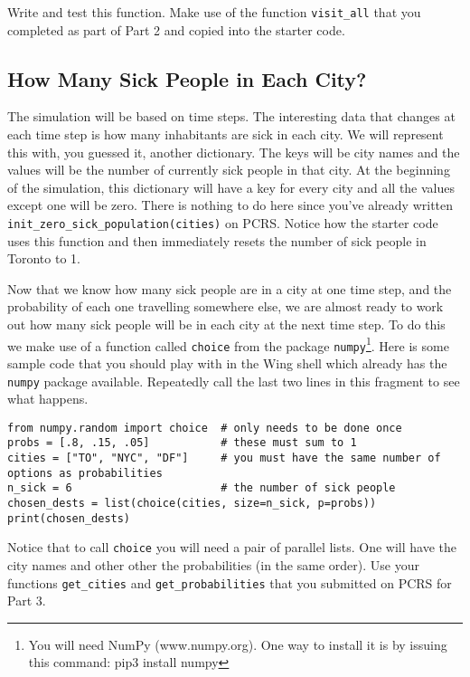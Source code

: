 \documentclass{assignment}
\begin{document}
Write and test this function. Make use of the function \verb|visit_all| that you completed as part of Part 2 and copied into the starter code.

\subsection*{How Many Sick People in Each City?}
 
The simulation will be based on time steps. The interesting data that changes at each time step is how many inhabitants are sick in each city. We will
represent this with, you guessed it, another dictionary. The keys will be city names and the values will be the number of currently sick people
in that city. At the beginning of the simulation, this dictionary will have a key for every city and all the values except one will be zero.
There is nothing to do here since you've already written \verb|init_zero_sick_population(cities)| on PCRS. Notice how the starter
code uses this function and then immediately resets the number of sick people in Toronto to 1.

Now that we know how many sick people are in a city at one time step, and the probability of each one travelling somewhere else, we are almost ready to work out how many sick people will be in each city at the next time step.
To do this we make use of a function called \verb|choice| from the package \verb|numpy|\footnote{You will need NumPy (www.numpy.org).  One way to install it is by issuing this command: pip3 install numpy}. Here is some sample code that you should play with
in the Wing shell which already has the \verb|numpy| package available. Repeatedly call the last two lines in this fragment to see what happens.

\begin{verbatim}
from numpy.random import choice  # only needs to be done once
probs = [.8, .15, .05]           # these must sum to 1
cities = ["TO", "NYC", "DF"]     # you must have the same number of options as probabilities
n_sick = 6                       # the number of sick people
chosen_dests = list(choice(cities, size=n_sick, p=probs))
print(chosen_dests)
\end{verbatim}

Notice that to call \verb|choice| 
you will need a pair of parallel lists. One will have the city names and other other the probabilities (in the same order). Use your functions
\verb|get_cities| and \verb|get_probabilities| that you submitted on PCRS for Part 3. 
\end{document}
